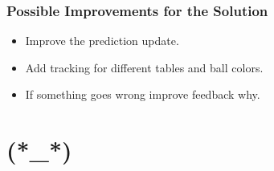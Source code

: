 \documentclass{beamer}
\begin{document}
\begin{frame}
	\frametitle{Possible Improvements for the Solution}
	\begin{itemize}
		\item Improve the prediction update.
		\item Add tracking for different tables and ball colors. 
		\item If something goes wrong improve feedback why.
	\end{itemize}
\end{frame}


\section{(*\_*)}

\end{document}
